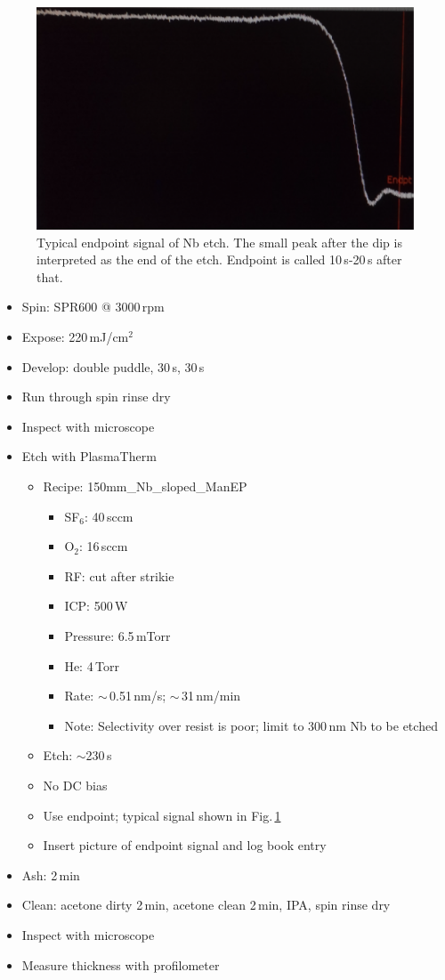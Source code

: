 \begin{figure}[!h]
\centering
\includegraphics[width=14cm]{figures/plasmatherm_Nb_sloped_endpoint.png}
\caption{\label{fig:plasmatherm_Nb_sloped_endpoint}Typical endpoint signal of Nb etch. The small peak after the dip is interpreted as the end of the etch. Endpoint is called 10\,s-20\,s after that.}
\end{figure}

\begin{itemize}
\item Spin: SPR600 @ 3000\,rpm
\item Expose: 220\,mJ/cm$^2$
\item Develop: double puddle, 30\,s, 30\,s
\item Run through spin rinse dry
\item Inspect with microscope
\item Etch with PlasmaTherm
\begin{itemize}
\item Recipe: 150mm\_Nb\_sloped\_ManEP
\begin{itemize}
\item SF$_6$: 40\,sccm
\item O$_2$: 16\,sccm
\item RF: cut after strikie
\item ICP: 500\,W
\item Pressure: 6.5\,mTorr
\item He: 4\,Torr
\item Rate: $\sim$\,0.51\,nm/s; $\sim$\,31\,nm/min
\item Note: Selectivity over resist is poor; limit to 300\,nm Nb to be etched
\end{itemize}
\item Etch: $\sim$230\,s
\item No DC bias
\item Use endpoint; typical signal shown in Fig.\,\ref{fig:plasmatherm_Nb_sloped_endpoint}
\item Insert picture of endpoint signal and log book entry
\end{itemize}
\item Ash: 2\,min
\item Clean: acetone dirty 2\,min, acetone clean 2\,min, IPA, spin rinse dry
\item Inspect with microscope
\item Measure thickness with profilometer
\end{itemize}



